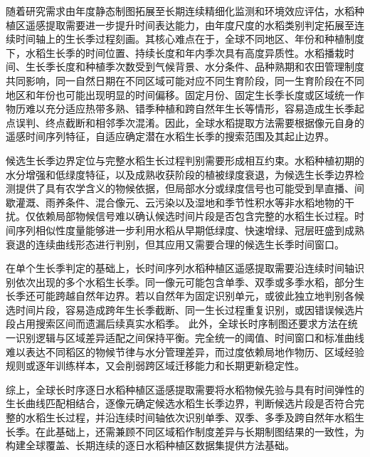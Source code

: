 随着研究需求由年度静态制图拓展至长期连续精细化监测和环境效应评估，水稻种植区遥感提取需要进一步提升时间表达能力，由年度尺度的水稻类别判定拓展至连续时间轴上的生长季过程刻画。其核心难点在于，全球不同地区、年份和种植制度下，水稻生长季的时间位置、持续长度和年内季次具有高度异质性。水稻播栽时间、生长季长度和种植季次数受到气候背景、水分条件、品种熟期和农田管理制度共同影响，同一自然日期在不同区域可能对应不同生育阶段，同一生育阶段在不同地区和年份也可能出现明显的时间偏移。固定月份、固定生长季长度或区域统一作物历难以充分适应热带多熟、错季种植和跨自然年生长等情形，容易造成生长季起点误判、终点截断和相邻季次混淆。因此，全球水稻提取方法需要根据像元自身的遥感时间序列特征，自适应确定潜在水稻生长季的搜索范围及其起止边界。

候选生长季边界定位与完整水稻生长过程判别需要形成相互约束。水稻种植初期的水分增强和低绿度特征，以及成熟收获阶段的植被绿度衰退，为候选生长季边界检测提供了具有农学含义的物候依据，但局部水分或绿度信号也可能受到旱直播、间歇灌溉、雨养条件、混合像元、云污染以及湿地和季节性积水等非水稻地物的干扰。仅依赖局部物候信号难以确认候选时间片段是否包含完整的水稻生长过程。时间序列相似性度量能够进一步利用水稻从早期低绿度、快速增绿、冠层旺盛到成熟衰退的连续曲线形态进行判别，但其应用又需要合理的候选生长季时间窗口。%

在单个生长季判定的基础上，长时间序列水稻种植区遥感提取需要沿连续时间轴识别依次出现的多个水稻生长季。同一像元可能包含单季、双季或多季水稻，部分生长季还可能跨越自然年边界。若以自然年为固定识别单元，或彼此独立地判别各候选时间片段，容易造成跨年生长季截断、同一生长过程重复识别，或因错误候选片段占用搜索区间而遗漏后续真实水稻季。%
此外，全球长时序制图还要求方法在统一识别逻辑与区域差异适配之间保持平衡。完全统一的阈值、时间窗口和标准曲线难以表达不同稻区的物候节律与水分管理差异，而过度依赖局地作物历、区域经验规则或逐年训练样本，又会削弱跨区域迁移能力和长期更新稳定性。%

综上，全球长时序逐日水稻种植区遥感提取需要将水稻物候先验与具有时间弹性的生长曲线匹配相结合，逐像元确定候选水稻生长季边界，判断候选片段是否符合完整的水稻生长过程，并沿连续时间轴依次识别单季、双季、多季及跨自然年水稻生长季。在此基础上，还需兼顾不同区域稻作制度差异与长期制图结果的一致性，为构建全球覆盖、长期连续的逐日水稻种植区数据集提供方法基础。
\clearpage

